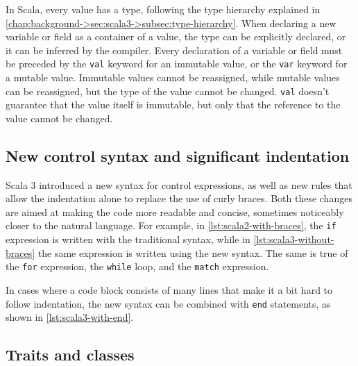 In Scala, every value has a type, following the type hierarchy explained in \cref{chap:background->sec:scala3->subsec:type-hierarchy}.
%
When declaring a new variable or field as a container of a value, the type can be explicitly declared, or it can be inferred by the compiler.
%
Every declaration of a variable or field must be preceded by the \texttt{val} keyword for an immutable value, or the \texttt{var} keyword for a mutable value.
%
Immutable values cannot be reassigned, while mutable values can be reassigned, but the type of the value cannot be changed.
%
\texttt{val} doesn't guarantee that the value itself is immutable, but only that the reference to the value cannot be changed.


\subsection{New control syntax and significant indentation}

Scala 3 introduced a new syntax for control expressions, as well as new rules that allow the indentation alone to replace the use of curly braces.
%
Both these changes are aimed at making the code more readable and concise, sometimes noticeably closer to the natural language.
%
For example, in \cref{lst:scala2-with-braces}, the \texttt{if} expression is written with the traditional syntax, while in \cref{lst:scala3-without-braces} the same expression is written using the new syntax.
%
The same is true of the \texttt{for} expression, the \texttt{while} loop, and the \texttt{match} expression.




In cases where a code block consists of many lines that make it a bit hard to follow indentation, the new syntax can be combined with \texttt{end} statements, as shown in \cref{lst:scala3-with-end}.




\subsection{Traits and classes}

